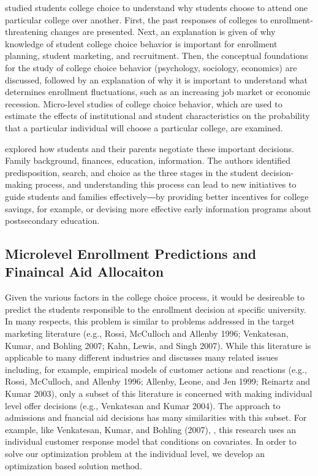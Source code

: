 \documentclass[12pt,english]{report}
\begin{document}
\citet{Paulsen1990} studied students college choice to understand why students
choose to attend one particular college over another. First, the past responses
of colleges to enrollment-threatening changes are presented. Next, an
explanation is given of why knowledge of student college choice behavior is
important for enrollment planning, student marketing, and recruitment. Then,
the conceptual foundations for the study of college choice behavior
(psychology, sociology, economics) are discussed, followed by an explanation of
why it is important to understand what determines enrollment fluctuations, such
as an increasing job market or economic recession. Micro-level studies of
college choice behavior, which are used to estimate the effects of
institutional and student characteristics on the probability that a particular
individual will choose a particular college, are examined.

\citet{Hossler1998} explored how students and their parents negotiate these
important decisions. Family background, finances, education, information. The
authors identified predisposition, search, and choice as the three stages in
the student decision-making process, and understanding this process can lead to
new initiatives to guide students and families effectively―by providing better
incentives for college savings, for example, or devising more effective early
information programs about postsecondary education.

\subsection{Microlevel Enrollment Predictions and Finaincal Aid Allocaiton} 
Given the various factors in the college choice process, it would be desireable
to predict the students responsible to the enrollment decision at specific
university.  In many respects, this problem is similar to problems addressed in
the target marketing literature (e.g., Rossi, McCulloch and Allenby 1996;
Venkatesan, Kumar, and Bohling 2007; Kahn, Lewis, and Singh 2007). While this
literature is applicable to many different industries and discusses many
related issues including, for example, empirical models of customer actions and
reactions (e.g., Rossi, McCulloch, and Allenby 1996; Allenby, Leone, and Jen
1999; Reinartz and Kumar 2003), only a subset of this literature is concerned
with making individual level offer decisions (e.g., Venkatesan and Kumar 2004).
The approach to admissions and fnancial aid decisions has many similarities
with this subset.  For example, like Venkatesan, Kumar, and Bohling (2007),
\citep{Carter2011}, this research uses an individual customer response model
that conditions on covariates.  In order to solve our optimization problem at
the individual level, we develop an optimization based solution method.
\end{document}
